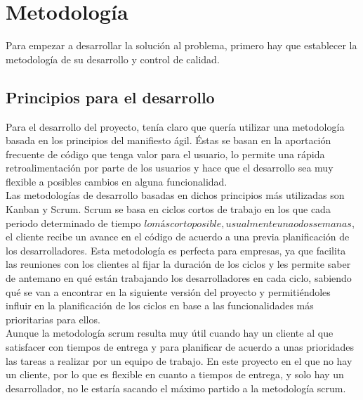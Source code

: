 \chapter{Metodología}
Para empezar a desarrollar la solución al problema, primero hay que establecer la metodología de su desarrollo y
control de calidad.\\

\section{Principios para el desarrollo}
Para el desarrollo del proyecto, tenía claro que quería utilizar una metodología basada en los principios del
manifiesto ágil\cite{agile}. Éstas se basan en la aportación frecuente de código que tenga valor para el usuario, lo
permite una rápida retroalimentación por parte de los usuarios y hace que el desarrollo sea muy flexible a posibles
cambios en alguna funcionalidad.\\

Las metodologías de desarrollo basadas en dichos principios más utilizadas son Kanban\cite{kanban} y Scrum\cite{scrum}.
Scrum se basa en ciclos cortos de trabajo en los que cada periodo determinado de tiempo \(lo más corto posible,
usualmente una o dos semanas\), el cliente recibe un avance en el código de acuerdo a una previa planificación de los
desarrolladores. Esta metodología es perfecta para empresas, ya que facilita las reuniones con los clientes al fijar la
duración de los ciclos y les permite saber de antemano en qué están trabajando los desarrolladores en cada ciclo,
sabiendo qué se van a encontrar en la siguiente versión del proyecto y permitiéndoles influir en la planificación de
los ciclos en base a las funcionalidades más prioritarias para ellos.\\

Aunque la metodología scrum resulta muy útil cuando hay un cliente al que satisfacer con tiempos de entrega y para
planificar de acuerdo a unas prioridades las tareas a realizar por un equipo de trabajo. En este proyecto en el que no
hay un cliente, por lo que es flexible en cuanto a tiempos de entrega, y solo hay un desarrollador, no le estaría
sacando el máximo partido a la metodología scrum.\\

